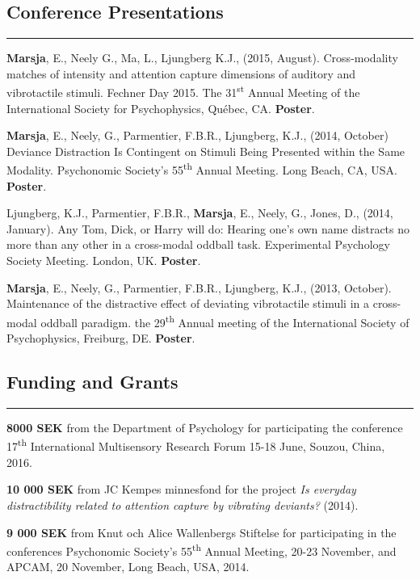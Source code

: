 \documentclass[]{article}
\begin{document}
\subsection{Conference Presentations}\label{conference-presentations}

\hrule

\textbf{Marsja}, E., Neely G., Ma, L., Ljungberg K.J., (2015, August).
Cross-modality matches of intensity and attention capture dimensions of
auditory and vibrotactile stimuli. Fechner Day 2015. The
31\textsuperscript{st} Annual Meeting of the International Society for
Psychophysics, Québec, CA. \textbf{Poster}.

\textbf{Marsja}, E., Neely, G., Parmentier, F.B.R., Ljungberg, K.J.,
(2014, October) Deviance Distraction Is Contingent on Stimuli Being
Presented within the Same Modality. Psychonomic Society's
55\textsuperscript{th} Annual Meeting. Long Beach, CA, USA.
\textbf{Poster}.

Ljungberg, K.J., Parmentier, F.B.R., \textbf{Marsja}, E., Neely, G.,
Jones, D., (2014, January). Any Tom, Dick, or Harry will do: Hearing
one's own name distracts no more than any other in a cross-modal oddball
task. Experimental Psychology Society Meeting. London, UK.
\textbf{Poster}.

\textbf{Marsja}, E., Neely, G., Parmentier, F.B.R., Ljungberg, K.J.,
(2013, October). Maintenance of the distractive effect of deviating
vibrotactile stimuli in a cross-modal oddball paradigm. the
29\textsuperscript{th} Annual meeting of the International Society of
Psychophysics, Freiburg, DE. \textbf{Poster}.

\subsection{Funding and Grants}\label{funding-and-grants}

\hrule

\textbf{8000 SEK} from the Department of Psychology for participating
the conference 17\textsuperscript{th} International Multisensory
Research Forum 15-18 June, Souzou, China, 2016.

\textbf{10 000 SEK} from JC Kempes minnesfond for the project \emph{Is
everyday distractibility related to attention capture by vibrating
deviants?} (2014).

\textbf{9 000 SEK} from Knut och Alice Wallenbergs Stiftelse for
participating in the conferences Psychonomic Society's
55\textsuperscript{th} Annual Meeting, 20-23 November, and APCAM, 20
November, Long Beach, USA, 2014.
\end{document}
